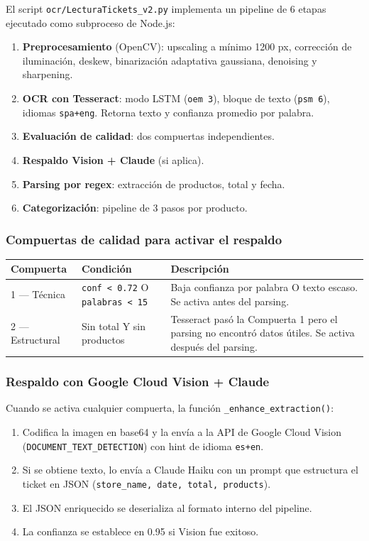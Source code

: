 \documentclass[12pt, letterpaper]{article}
\newcommand{\archivo}[1]{\texttt{\small\color{gristexto}#1}}
\newcommand{\campo}[1]{\texttt{#1}}
\begin{document}
El script \archivo{ocr/LecturaTickets\_v2.py} implementa un pipeline de
6 etapas ejecutado como subproceso de Node.js:

\begin{enumerate}
  \item \textbf{Preprocesamiento} (OpenCV): upscaling a mínimo 1200 px,
        corrección de iluminación, deskew, binarización adaptativa gaussiana,
        denoising y sharpening.
  \item \textbf{OCR con Tesseract}: modo LSTM (\campo{oem 3}), bloque de
        texto (\campo{psm 6}), idiomas \campo{spa+eng}. Retorna texto y
        confianza promedio por palabra.
  \item \textbf{Evaluación de calidad}: dos compuertas independientes.
  \item \textbf{Respaldo Vision + Claude} (si aplica).
  \item \textbf{Parsing por regex}: extracción de productos, total y fecha.
  \item \textbf{Categorización}: pipeline de 3 pasos por producto.
\end{enumerate}

\subsubsection{Compuertas de calidad para activar el respaldo}

\begin{tabular}{llp{6cm}}
  \toprule
  \textbf{Compuerta} & \textbf{Condición} & \textbf{Descripción} \\
  \midrule
  1 — Técnica &
    \campo{conf < 0.72} O \campo{palabras < 15} &
    Baja confianza por palabra O texto escaso. Se activa antes del parsing. \\[4pt]
  2 — Estructural &
    Sin total Y sin productos &
    Tesseract pasó la Compuerta 1 pero el parsing no encontró datos útiles.
    Se activa después del parsing. \\
  \bottomrule
\end{tabular}

\subsubsection{Respaldo con Google Cloud Vision + Claude}

Cuando se activa cualquier compuerta, la función \campo{\_enhance\_extraction()}:

\begin{enumerate}
  \item Codifica la imagen en base64 y la envía a la API de Google Cloud Vision
        (\campo{DOCUMENT\_TEXT\_DETECTION}) con hint de idioma \campo{es+en}.
  \item Si se obtiene texto, lo envía a Claude Haiku con un prompt que
        estructura el ticket en JSON (\campo{store\_name, date, total, products}).
  \item El JSON enriquecido se deserializa al formato interno del pipeline.
  \item La confianza se establece en 0.95 si Vision fue exitoso.
\end{enumerate}
\end{document}
